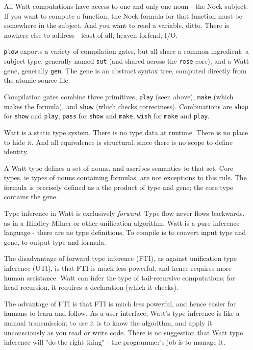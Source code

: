 \documentclass[10pt, nocopyrightspace]{sigplanconf}
\begin{document}
All Watt computations have access to one and only one noun - the
Nock subject.  If you want to compute a function, the Nock
formula for that function must be somewhere in the subject.  And
you want to read a variable, ditto.  There is nowhere else to
address - least of all, heaven forfend, I/O.

\verb|plow| exports a variety of compilation gates, but all share
a common ingredient: a subject type, generally named \verb|sut|
(and shared across the \verb|rose| core), and a Watt gene,
generally \verb|gen|.  The gene is an abstract syntax tree,
computed directly from the atomic source file.

Compilation gates combine three primitives, \verb|play| (seen
above), \verb|make| (which makes the formula), and \verb|show|
(which checks correctness).  Combinations are \verb|shop| for
\verb|show| and \verb|play|, \verb|pass| for \verb|show| and
\verb|make|, \verb|wish| for \verb|make| and \verb|play|.

Watt is a static type system.  There is no type data at runtime.
There is no place to hide it.  And all equivalence is structural,
since there is no scope to define identity.

A Watt type defines a set of nouns, and ascribes semantics to
that set.  Core types, ie types of nouns containing formulas, are
not exceptions to this rule.  The formula is precisely defined as
a the product of type and gene; the core type contains the gene.

Type inference in Watt is exclusively \emph{forward}.  Type flow
never flows backwards, as in a Hindley-Milner
\citep{hindleymilner} or other
unification algorithm.  Watt is a pure inference language - there
are no type definitions.  To compile is to convert input type and
gene, to output type and formula.

The disadvantage of forward type inference (FTI), as against
unification type inference (UTI), is that FTI is much less
powerful, and hence requires more human assistance.  Watt can
infer the type of tail-recursive computations; for head
recursion, it requires a declaration (which it checks).

The advantage of FTI is that FTI is much less powerful, and
hence easier for humans to learn and follow.  As a user
interface, Watt's type inference is like a manual transmission;
to use it is to know the algorithm, and apply it unconsciously as
you read or write code.  There is no suggestion that Watt type
inference will "do the right thing" - the programmer's job is to
manage it.
\end{document}
